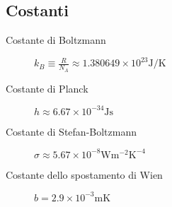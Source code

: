 \documentclass[10pt, oneside]{article}
\begin{document}
\subsection{Costanti}
\begin{description}
\item[Costante di Boltzmann] $\displaystyle k_B \equiv \frac{R}{N_A} \approx 1.380649 \times 10^{23} \mathrm{J/K}$ 
\item[Costante di Planck] $\displaystyle h \approx 6.67 \times 10^{-34} \mathrm{Js}$
\item[Costante di Stefan-Boltzmann] $\displaystyle \sigma \approx 5.67 \times 10^{-8} \mathrm{W m^{-2} K^{-4}}$
\item[Costante dello spostamento di Wien] $\displaystyle b = 2.9 \times 10^{-3} \mathrm{m K}$
\end{description}
\end{document}
